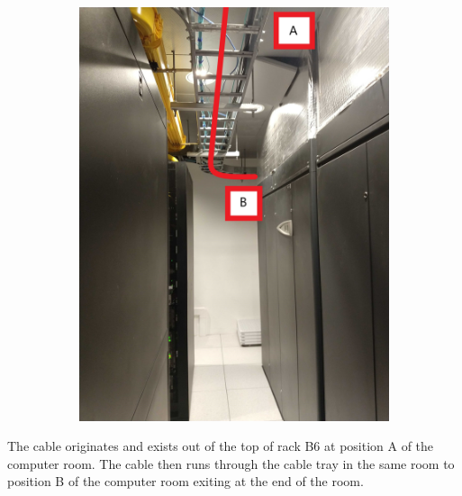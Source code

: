 \begin{figure}
\begin{subfigure}{0.40\textwidth}
      \includegraphics[width=\textwidth]{images/12.jpg}
    \end{subfigure}
  \end{figure}
  The cable originates and exists out of the top of rack B6 at position A of the computer room. The cable then runs through the cable tray in the same room to position B of the computer room exiting at the end of the room.
  
\newpage

